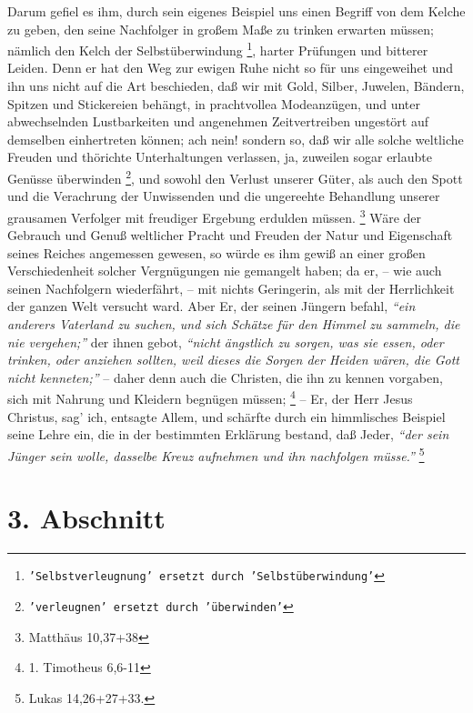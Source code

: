 Darum gefiel es ihm, durch sein eigenes Beispiel uns einen Begriff von dem
Kelche zu geben, den seine Nachfolger in großem Maße zu trinken erwarten müssen;
nämlich den Kelch der Selbstüberwindung
\footnote{\texttt{'Selbstverleugnung' ersetzt durch 'Selbstüberwindung'}},
harter Prüfungen und bitterer Leiden.
Denn er hat den Weg zur ewigen Ruhe nicht so für uns eingeweihet und ihn uns
nicht auf die Art beschieden, daß wir mit Gold, Silber, Juwelen, Bändern,
Spitzen und Stickereien behängt, in prachtvollea Modeanzügen, und unter
abwechselnden Lustbarkeiten und angenehmen Zeitvertreiben ungestört auf
demselben einhertreten können; ach nein! sondern so, daß wir alle solche
weltliche Freuden und thörichte Unterhaltungen verlassen, ja, zuweilen sogar
erlaubte Genüsse überwinden
\footnote{\texttt{'verleugnen' ersetzt durch 'überwinden'}},
und sowohl den Verlust unserer Güter, als auch den
Spott und die Verachrung der Unwissenden und die ungereehte Behandlung unserer
grausamen Verfolger mit freudiger Ergebung erdulden müssen.
\footnote{Matthäus 10,37+38 }
Wäre der Gebrauch und Genuß weltlicher Pracht und Freuden der Natur
und Eigenschaft seines Reiches angemessen gewesen, so würde es ihm gewiß an
einer großen Verschiedenheit solcher Vergnügungen nie gemangelt haben; da er, --
wie auch seinen Nachfolgern wiederfährt, -- mit nichts Geringerin, als mit der
Herrlichkeit der ganzen Welt versucht ward. Aber Er, der seinen Jüngern befahl,
\textit{"`ein anderers Vaterland zu suchen, und sich Schätze für den Himmel zu
sammeln, die nie vergehen;"'} der ihnen gebot,
\textit{"`nicht ängstlich zu sorgen, was sie essen,
oder trinken, oder anziehen sollten, weil dieses die Sorgen der Heiden wären,
die Gott nicht kenneten;"'} -- daher denn auch die Christen, die ihn zu kennen
vorgaben, sich mit Nahrung und Kleidern begnügen müssen;
\footnote{1. Timotheus 6,6-11}
-- Er, der Herr Jesus Christus, sag’ ich, entsagte Allem, und schärfte
durch ein himmlisches Beispiel seine Lehre ein, die in der bestimmten Erklärung
bestand, daß Jeder,
\textit{"`der sein Jünger sein wolle, dasselbe Kreuz aufnehmen und
ihn nachfolgen müsse."'}
\footnote{Lukas 14,26+27+33.}

\section{3. Abschnitt} \label{kap16_ab3}

